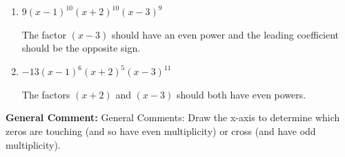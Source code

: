 \documentclass{extbook}[14pt]
\begin{document}
\begin{enumerate}
{\begin{enumerate}[label=\Alph*.]
The factor $(x - 3)$ should have an even power.
\item \( 9(x - 1)^{10} (x + 2)^{10} (x - 3)^{9} \)

The factor $(x - 3)$ should have an even power and the leading coefficient should be the opposite sign.
\item \( -13(x - 1)^{6} (x + 2)^{5} (x - 3)^{11} \)

The factors $(x + 2)$ and $(x - 3)$ should both have even powers.
\end{enumerate}

\textbf{General Comment:} General Comments: Draw the x-axis to determine which zeros are touching (and so have even multiplicity) or cross (and have odd multiplicity).
}
\end{enumerate}
\end{document}
